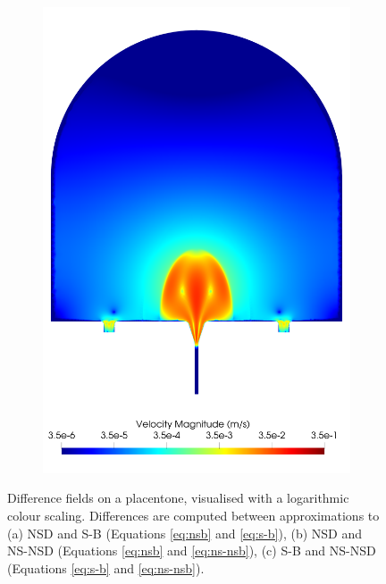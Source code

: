 \begin{figure}
\begin{subfigure}[b]{0.45\textwidth}
            \includegraphics[width=\textwidth]{diagrams/results-modelling/velocity-comparison/meshandsoln_dg_velocity_placentone_12_velocity-log.png}
            \caption{}
            \label{fig:4-models-placentone-norm-log:12}
        \end{subfigure}       

        \caption{Difference fields on a placentone, visualised with a logarithmic colour scaling. Differences are computed between approximations to (a) NSD and S-B (Equations \eqref{eq:nsb} and \eqref{eq:s-b}), (b) NSD and NS-NSD (Equations \eqref{eq:nsb} and \eqref{eq:ns-nsb}), (c) S-B and NS-NSD (Equations \eqref{eq:s-b} and \eqref{eq:ns-nsb}).}
        \label{fig:4-models-placentone-norm-log}
    \end{figure}

